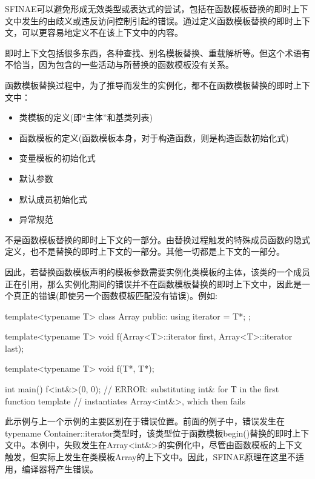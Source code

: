 SFINAE可以避免形成无效类型或表达式的尝试，包括在函数模板替换的即时上下文中发生的由歧义或违反访问控制引起的错误。通过定义函数模板替换的即时上下文，可以更容易地定义不在该上下文中的内容。

\begin{notice}即时上下文包括很多东西，各种查找、别名模板替换、重载解析等。但这个术语有不恰当，因为包含的一些活动与所替换的函数模板没有关系。
\end{notice}

函数模板替换过程中，为了推导而发生的实例化，都不在函数模板替换的即时上下文中：

\begin{itemize}
\item 
类模板的定义(即“主体”和基类列表)

\item 
函数模板的定义(函数模板本身，对于构造函数，则是构造函数初始化式)

\item 
变量模板的初始化式

\item 
默认参数

\item 
默认成员初始化式

\item 
异常规范
\end{itemize}

不是函数模板替换的即时上下文的一部分。由替换过程触发的特殊成员函数的隐式定义，也不是替换的即时上下文的一部分。其他一切都是上下文的一部分。

因此，若替换函数模板声明的模板参数需要实例化类模板的主体，该类的一个成员正在引用，那么实例化期间的错误并不在函数模板替换的即时上下文中，因此是一个真正的错误(即使另一个函数模板匹配没有错误)。例如:

\begin{cpp}
template<typename T>
class Array {
	public:
	using iterator = T*;
};

template<typename T>
void f(Array<T>::iterator first, Array<T>::iterator last);

template<typename T>
void f(T*, T*);

int main()
{
	f<int&>(0, 0); // ERROR: substituting int& for T in the first function template
} // instantiates Array<int&>, which then fails
\end{cpp}

此示例与上一个示例的主要区别在于错误位置。前面的例子中，错误发生在typename Container::iterator类型时，该类型位于函数模板begin()替换的即时上下文中。本例中，失败发生在Array<int\&>的实例化中，尽管由函数模板的上下文触发，但实际上发生在类模板Array的上下文中。因此，SFINAE原理在这里不适用，编译器将产生错误。

